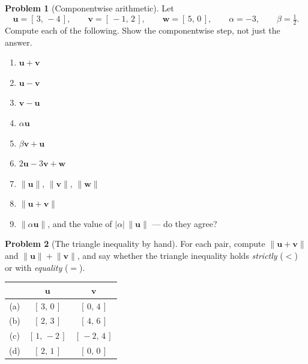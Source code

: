 \documentclass[11pt]{article}
\theoremstyle{definition}
\newtheorem{prob}{Problem}[section]
\newcommand{\vc}[1]{\mathbf{#1}}
\newcommand{\norm}[1]{\lVert #1\rVert}
\begin{document}
\begin{prob}[Componentwise arithmetic]
Let
\[
  \vc{u}=[\,3,\,-4\,],\qquad
  \vc{v}=[\,-1,\,2\,],\qquad
  \vc{w}=[\,5,\,0\,],\qquad
  \alpha=-3,\qquad \beta=\tfrac12 .
\]
Compute each of the following. Show the componentwise step, not just the answer.

\begin{enumerate}[label=\textbf{(\alph*)},leftmargin=2.6em,itemsep=7pt,topsep=6pt]
  \item $\vc{u}+\vc{v}$
  \item $\vc{u}-\vc{v}$
  \item $\vc{v}-\vc{u}$
  \item $\alpha\vc{u}$
  \item $\beta\vc{v}+\vc{u}$
  \item $2\vc{u}-3\vc{v}+\vc{w}$
  \item $\norm{\vc{u}}$, $\norm{\vc{v}}$, $\norm{\vc{w}}$
  \item $\norm{\vc{u}+\vc{v}}$
  \item $\norm{\alpha\vc{u}}$, and the value of
        $\lvert\alpha\rvert\,\norm{\vc{u}}$ --- do they agree?
\end{enumerate}
\end{prob}

\begin{prob}[The triangle inequality by hand]
For each pair, compute $\norm{\vc{u}+\vc{v}}$ and $\norm{\vc{u}}+\norm{\vc{v}}$,
and say whether the triangle inequality holds \emph{strictly} ($<$) or with
\emph{equality} ($=$).

\begin{center}
\renewcommand{\arraystretch}{1.2}
\begin{tabular}{@{}c c c@{}}
\toprule
 & $\vc{u}$ & $\vc{v}$ \\
\midrule
(a) & $[\,3,\,0\,]$   & $[\,0,\,4\,]$   \\
(b) & $[\,2,\,3\,]$   & $[\,4,\,6\,]$   \\
(c) & $[\,1,\,-2\,]$  & $[\,-2,\,4\,]$  \\
(d) & $[\,2,\,1\,]$   & $[\,0,\,0\,]$   \\
\bottomrule
\end{tabular}
\end{center}
\end{prob}
\end{document}
